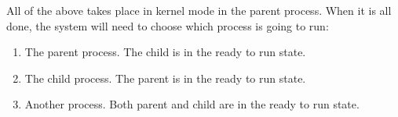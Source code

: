 All of the above takes place in kernel mode in the parent process. When it is all done, the system will need to choose which process is going to run: 

\begin{enumerate}
	\item The parent process. The child is in the ready to run state.
	\item The child process. The parent is in the ready to run state.
	\item Another process. Both parent and child are in the ready to run state.
\end{enumerate}




